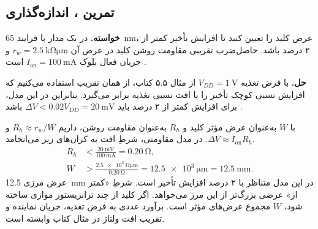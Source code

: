 \subsection{تمرین ، اندازه‌گذاری }
\label{sec:assignment-power-header}

\textbf{خواسته.}
در یک مدار  با فرایند \qty{65}{\nano\metre}،
عرض کلید  را تعیین کنید تا افزایش تأخیر کمتر از
۲ درصد باشد. حاصل‌ضرب تقریبی مقاومت روشن کلید در عرض آن
\(r_w=\qty{2.5}{\kilo\ohm\micro\metre}\) و جریان فعال بلوک
\(I_{\mathrm{on}}=\qty{100}{\milli\ampere}\) است
\cite[تمرین ، صفحه ۲۱۰]{weste}.

\textbf{حل.}
با فرض تغذیه \(V_{DD}=\qty{1}{\volt}\) از مثال ۵.۵ کتاب،
از همان تقریب استفاده می‌کنیم که افزایش نسبی کوچک تأخیر را
با افت نسبی تغذیه برابر می‌گیرد. بنابراین در این مدل، برای
افزایش کمتر از ۲ درصد باید \(\Delta V<0.02V_{DD}=\qty{20}{\milli\volt}\)
باشد \cite[مثال ۵.۵، صفحات ۱۹۸ و ۱۹۹ و رابطه ،
صفحه ۱۶۲]{weste}.

با \(W\) به‌عنوان عرض مؤثر کلید و \(R_h\) به‌عنوان مقاومت روشن،
داریم \(R_h\approx r_w/W\) و \(\Delta V\approx I_{\mathrm{on}}R_h\).
در مدل مقاومتی، شرطِ افت به کران‌های زیر می‌انجامد.
\[
  \begin{aligned}
    R_h &< \frac{\qty{20}{\milli\volt}}{\qty{100}{\milli\ampere}}
          =\qty{0.20}{\ohm},\\
    W &> \frac{\qty{2.5e3}{\ohm\micro\metre}}{\qty{0.20}{\ohm}}
         =\qty{12.5e3}{\micro\metre}=\qty{12.5}{\milli\metre}.
  \end{aligned}
\]
عرض مرزی \qty{12.5}{\milli\metre} در این مدل متناظر با ۲ درصد
افزایش تأخیر است. شرطِ «کمتر از» عرضی بزرگ‌تر از این مرز می‌خواهد.
اگر کلید از چند ترانزیستور موازی ساخته شود، \(W\) مجموع عرض‌های
مؤثر است. برآورد عددی به فرض تغذیه، جریان نماینده و تقریب
افت ولتاژ در مثال کتاب وابسته است.
